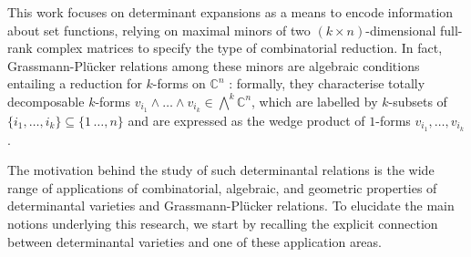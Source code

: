 \documentclass[10pt]{article}
\theoremstyle{remark}%
\theoremstyle{definition}%
\begin{document}
This work focuses on determinant expansions as a means to encode information about set functions, relying on maximal minors of two $(k\times n)$-dimensional full-rank complex matrices to specify the type of combinatorial reduction. In fact, Grassmann-Pl\"{u}cker relations among these minors are algebraic conditions entailing a reduction for $k$-forms on $\mathbb{C}^{n}$ \citep[Ch.3.1]{GKZ1994}: formally, they characterise totally de\-com\-po\-sa\-ble $k$-forms $v_{i_{1}}\wedge\dots \wedge v_{i_{k}}\in\bigwedge^{k}\mathbb{C}^{n}$, which are labelled by $k$-subsets of $\{i_{1},\dots,i_{k}\}\subseteq\{1\,\dots,n\}$ and are expressed as the wedge product of $1$-forms $v_{i_{1}},\dots,v_{i_{k}}$. %

The motivation behind the study of such determinantal relations is the wide range of applications of combinatorial, algebraic, and geometric properties of determinantal varieties and Grassmann-Pl\"{u}cker relations. To elucidate the main notions underlying this research, we start by recalling the explicit connection between determinantal varieties and one of these application areas. 
\end{document}
